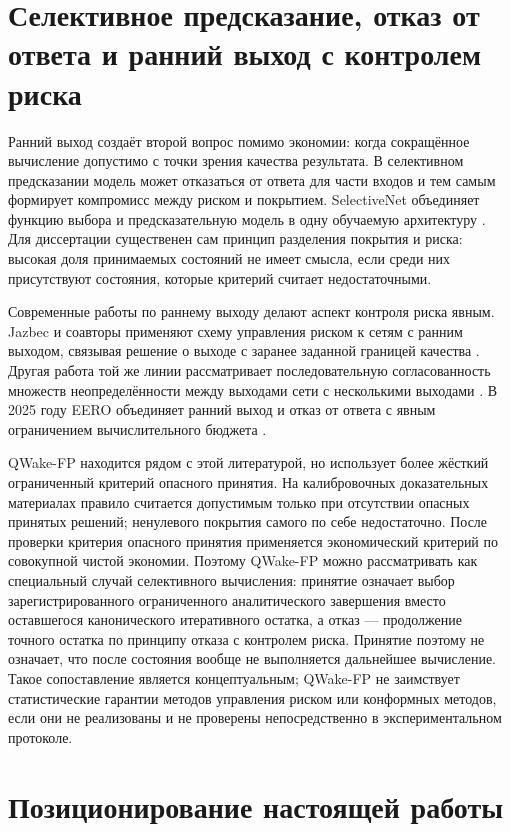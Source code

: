 \section{Селективное предсказание, отказ от ответа и ранний выход с контролем риска}
\label{sec:related-selective}

Ранний выход создаёт второй вопрос помимо экономии: когда сокращённое вычисление
допустимо с точки зрения качества результата. В селективном предсказании модель
может отказаться от ответа для части входов и тем самым формирует компромисс
между риском и покрытием. SelectiveNet объединяет функцию выбора и
предсказательную модель в одну обучаемую архитектуру
\cite{geifman2019selectivenet}. Для диссертации существенен сам принцип
разделения покрытия и риска: высокая доля принимаемых состояний не имеет смысла,
если среди них присутствуют состояния, которые критерий считает
недостаточными.

Современные работы по раннему выходу делают аспект контроля риска явным. Jazbec и
соавторы применяют схему управления риском к сетям с ранним выходом, связывая
решение о выходе с заранее заданной границей качества
\cite{jazbec2024riskcontrol}. Другая работа той же линии рассматривает
последовательную согласованность множеств неопределённости между выходами сети с
несколькими выходами \cite{jazbec2024nested}. В 2025 году EERO объединяет ранний
выход и отказ от ответа с явным ограничением вычислительного бюджета
\cite{valade2025eero}.

QWake-FP находится рядом с этой литературой, но использует более жёсткий
ограниченный критерий опасного принятия. На калибровочных доказательных материалах
правило считается допустимым только при отсутствии опасных принятых решений;
ненулевого покрытия самого по себе недостаточно. После проверки критерия опасного принятия
применяется экономический критерий по совокупной чистой экономии. Поэтому QWake-FP
можно рассматривать как специальный случай селективного вычисления: принятие
означает выбор зарегистрированного ограниченного аналитического завершения вместо
оставшегося канонического итеративного остатка, а отказ --- продолжение точного
остатка по принципу отказа с контролем риска. Принятие поэтому не означает, что
после состояния вообще не выполняется дальнейшее вычисление. Такое сопоставление является концептуальным; QWake-FP не
заимствует статистические гарантии методов управления риском или конформных
методов, если они не реализованы и не проверены непосредственно в
экспериментальном протоколе.

\section{Позиционирование настоящей работы}
\label{sec:related-positioning}

